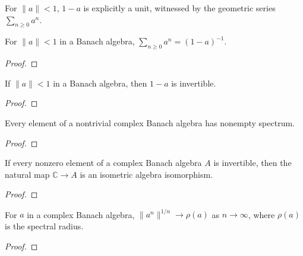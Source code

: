 \begin{definition}
  \label{def:neumann-unit}
  \leanok
  For $\|a\| < 1$, $1 - a$ is explicitly a unit, witnessed by the
  geometric series $\sum_{n \ge 0} a^n$.
\end{definition}

\begin{theorem}
  \label{thm:neumann-series}
  \leanok
  For $\|a\| < 1$ in a Banach algebra,
  $\sum_{n \ge 0} a^n = (1 - a)^{-1}$.
\end{theorem}
\begin{proof}
  \leanok
\end{proof}

\begin{theorem}
  \label{thm:one-sub-unit}
  \leanok
  If $\|a\| < 1$ in a Banach algebra, then $1 - a$ is invertible.
\end{theorem}
\begin{proof}
  \leanok
\end{proof}

\begin{theorem}
  \label{thm:spectrum-nonempty}
  \leanok
  Every element of a nontrivial complex Banach algebra has nonempty spectrum.
\end{theorem}
\begin{proof}
  \leanok
\end{proof}

\begin{theorem}
  \label{thm:gelfand-mazur}
  \leanok
  If every nonzero element of a complex Banach algebra $A$ is invertible,
  then the natural map $\mathbb{C} \to A$ is an isometric algebra
  isomorphism.
\end{theorem}
\begin{proof}
  \leanok
\end{proof}

\begin{theorem}
  \label{thm:gelfand-formula}
  \leanok
  For $a$ in a complex Banach algebra,
  $\|a^n\|^{1/n} \to \rho(a)$ as $n \to \infty$,
  where $\rho(a)$ is the spectral radius.
\end{theorem}
\begin{proof}
  \leanok
\end{proof}

